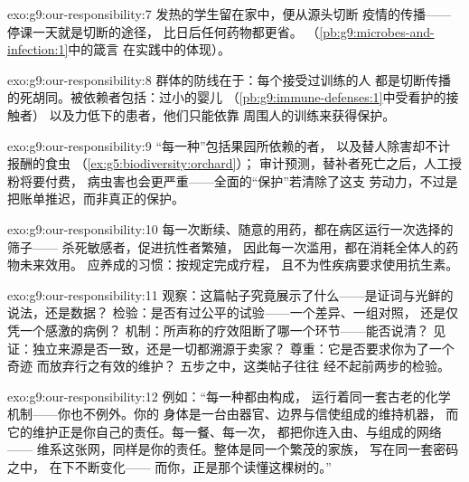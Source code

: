 \begin{solution}{exo:g9:our-responsibility:7}
发热的学生留在家中，便从源头切断
疫情的传播——停课一天就是切断的途径，
比日后任何药物都更省。
（\cref{pb:g9:microbes-and-infection:1}中的箴言
在实践中的体现）。
\end{solution}

\begin{solution}{exo:g9:our-responsibility:8}
群体的防线在于：每个接受过训练的人
都是切断传播的死胡同。被依赖者包括：过小的婴儿
（\cref{pb:g9:immune-defenses:1}中受看护的接触者）
以及力低下的患者，他们只能依靠
周围人的训练来获得保护。
\end{solution}

\begin{solution}{exo:g9:our-responsibility:9}
“每一种”包括果园所依赖的者，
以及替人除害却不计报酬的食虫
（\cref{ex:g5:biodiversity:orchard}）；
审计预测，替补者死亡之后，人工授粉将要付费，
病虫害也会更严重——全面的“保护”若清除了这支
劳动力，不过是把账单推迟，而非真正的保护。
\end{solution}

\begin{solution}{exo:g9:our-responsibility:10}
每一次断续、随意的用药，都在病区运行一次选择的筛子——
杀死敏感者，促进抗性者繁殖，
因此每一次滥用，都在消耗全体人的药物未来效用。
应养成的习惯：按规定完成疗程，
且不为性疾病要求使用抗生素。
\end{solution}

\begin{solution}{exo:g9:our-responsibility:11}
观察：这篇帖子究竟展示了什么——是证词与光鲜的说法，还是数据？
检验：是否有过公平的试验——一个差异、一组对照，
还是仅凭一个感激的病例？
机制：所声称的疗效阻断了哪一个环节——能否说清？
见证：独立来源是否一致，还是一切都溯源于卖家？
尊重：它是否要求你为了一个奇迹
而放弃行之有效的维护？
五步之中，这类帖子往往
经不起前两步的检验。
\end{solution}

\begin{solution}{exo:g9:our-responsibility:12}
例如：“每一种都由构成，
运行着同一套古老的化学机制——你也不例外。你的
身体是一台由器官、边界与信使组成的维持机器，
而它的维护正是你自己的责任。每一餐、每一次，
都把你连入由、与组成的网络——
维系这张网，同样是你的责任。整体是同一个繁茂的家族，
写在同一套密码之中，
在下不断变化——
而你，正是那个读懂这棵树的。”
\end{solution}

